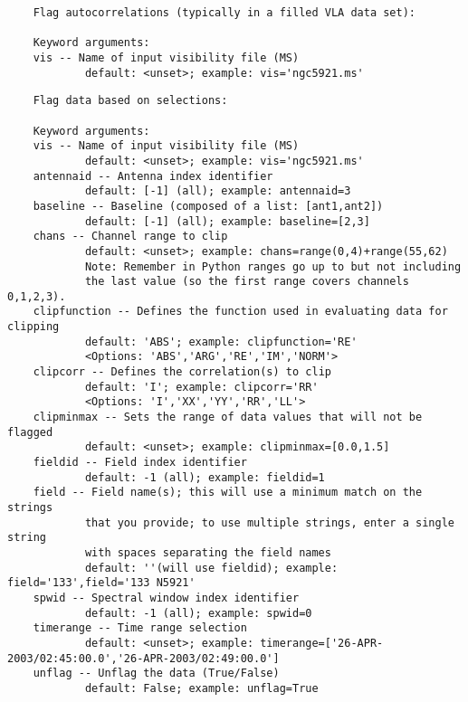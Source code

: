 \vspace{3mm}
\small
\begin{verbatim}
    Flag autocorrelations (typically in a filled VLA data set):
    
    Keyword arguments:
    vis -- Name of input visibility file (MS)
            default: <unset>; example: vis='ngc5921.ms'

\end{verbatim}
\normalsize

\vspace{3mm}
\small
\begin{verbatim}
    Flag data based on selections:
    
    Keyword arguments:
    vis -- Name of input visibility file (MS)
            default: <unset>; example: vis='ngc5921.ms'
    antennaid -- Antenna index identifier
            default: [-1] (all); example: antennaid=3
    baseline -- Baseline (composed of a list: [ant1,ant2])
            default: [-1] (all); example: baseline=[2,3]
    chans -- Channel range to clip
            default: <unset>; example: chans=range(0,4)+range(55,62)
            Note: Remember in Python ranges go up to but not including
            the last value (so the first range covers channels 0,1,2,3).
    clipfunction -- Defines the function used in evaluating data for clipping
            default: 'ABS'; example: clipfunction='RE'
            <Options: 'ABS','ARG','RE','IM','NORM'>
    clipcorr -- Defines the correlation(s) to clip
            default: 'I'; example: clipcorr='RR'
            <Options: 'I','XX','YY','RR','LL'>
    clipminmax -- Sets the range of data values that will not be flagged
            default: <unset>; example: clipminmax=[0.0,1.5]
    fieldid -- Field index identifier
            default: -1 (all); example: fieldid=1
    field -- Field name(s); this will use a minimum match on the strings
            that you provide; to use multiple strings, enter a single string
            with spaces separating the field names
            default: ''(will use fieldid); example: field='133',field='133 N5921'
    spwid -- Spectral window index identifier
            default: -1 (all); example: spwid=0
    timerange -- Time range selection
            default: <unset>; example: timerange=['26-APR-2003/02:45:00.0','26-APR-2003/02:49:00.0']
    unflag -- Unflag the data (True/False)
            default: False; example: unflag=True
\end{verbatim}
\normalsize

